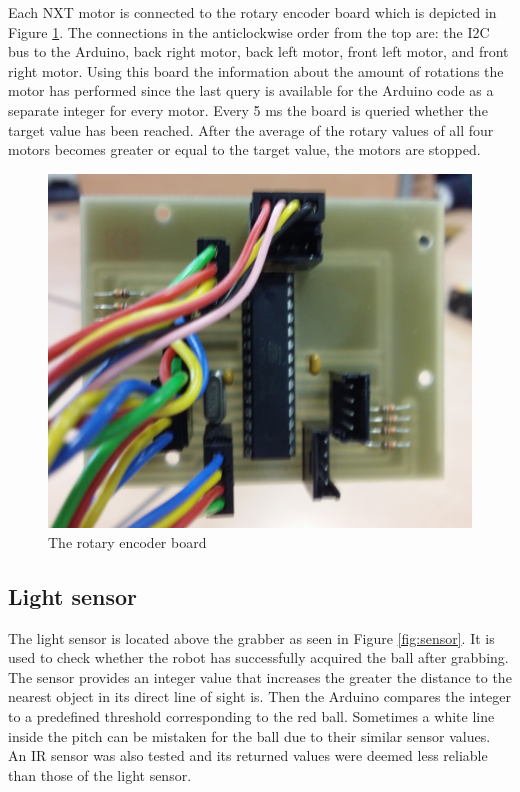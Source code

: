 \documentclass[a4paper,12pt]{article}
\begin{document}
Each NXT motor is connected to the rotary encoder board which is depicted in Figure \ref{fig:rotary}. The connections in the anticlockwise order from the top are: the I2C bus to the Arduino, back right motor, back left motor, front left motor, and front right motor. Using this board the information about the amount of rotations the motor has performed since the last query is available for the Arduino code as a separate integer for every motor. Every 5 ms the board is queried whether the target value has been reached. After the average of the rotary values of all four motors becomes greater or equal to the target value, the motors are stopped.

\begin{figure}[ht!]
\centering
\includegraphics[scale=.1]{rotary1}
\caption{The rotary encoder board}
\label{fig:rotary}
\end{figure}

\subsection{Light sensor}

The light sensor is located above the grabber as seen in Figure \ref{fig:sensor}. It is used to check whether
the robot has successfully acquired the ball after grabbing. The sensor
provides an integer value that increases the greater the distance to the
nearest object in its direct line of sight is. Then the Arduino compares the integer
to a predefined threshold corresponding to the red ball. Sometimes a white
line inside the pitch can be mistaken for the ball due to their similar sensor
values. An IR sensor was also tested and its returned values were deemed less reliable than
those of the light sensor.
\end{document}
